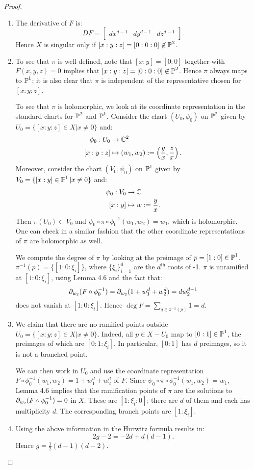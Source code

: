 \documentclass{article}
\begin{document}
\begin{proof}
\begin{enumerate}
\item The derivative of $F$ is:
\[	DF = \left[ \begin{array} {ccc} dx^{d-1} & dy^{d-1} & dz^{d-1} \end{array} \right].	\]
Hence $X$ is singular only if $[x:y:z] = [0:0:0] \not \in \operatorname{\mathbb{P}}^2$.
\item To see that $\pi$ is well-defined, note that $[x:y] = [0:0]$ together with $F(x,y,z) = 0$
implies that $[x:y:z] = [0:0:0] \not \in \operatorname{\mathbb{P}}^2$. Hence $\pi$ always maps to $\operatorname{\mathbb{P}}^1$; it is also
clear that $\pi$ is independent of the representative chosen for $[x:y:z]$.

To see that $\pi$ is holomorphic, we look at its coordinate representation in the standard charts
for $\operatorname{\mathbb{P}}^2$ and $\operatorname{\mathbb{P}}^1$. Consider the chart $(U_0,\phi_0)$ on $\operatorname{\mathbb{P}}^2$ given by $U_0 = \{[x:y:z] \in X 
| x\neq 0\}$ and:
\begin{align*}
\phi_0 : U_0 &\to \mathbb{C}^2 \\
[x:y:z] &\mapsto (w_1, w_2) := \left(\frac{y}{x}, \frac{z}{x}\right).
\end{align*}
Moreover, consider the chart $(V_0, \psi_0)$ on $\operatorname{\mathbb{P}}^1$ given by $V_0 = \{[x:y] \in \operatorname{\mathbb{P}}^1 | x \neq 0\}$
and:
\begin{align*}
\psi_0 : V_0 &\to \mathbb{C} \\
[x:y] &\mapsto w := \frac{y}{x}.
\end{align*}
Then $\pi(U_0) \subset V_0$ and $\psi_0 \circ \pi \circ \phi_0^{-1}(w_1, w_2) = w_1$, which is holomorphic.
One can check in a similar fashion that the other coordinate representations of $\pi$ are holomorphic as
well.

We compute the degree of $\pi$ by looking at the preimage of $p = [1:0] \in \operatorname{\mathbb{P}}^1$. $\pi^{-1}(p) =
\{ [1:0:\xi_i] \}$, where $\{\xi_i\}_{i=1}^d$ are the $d^{\text{th}}$ roots of -1. $\pi$ is unramified
at $[1:0:\xi_i]$, using Lemma 4.6 and the fact that:
\[	\partial_{w_2}(F\circ \phi_0^{-1}) = \partial_{w_2}(1 + w_1^d + w_2^d) = dw_2^{d-1}	\]
does not vanish at $[1:0:\xi_i]$. Hence $\deg F = \sum_{q \in \pi^{-1}(p)} 1 = d$.
\item We claim that there are no ramified points outside $U_0 = \{[x:y:z] \in X | x\neq 0\}$. Indeed,
all $p \in X - U_0$ map to $[0:1] \in \operatorname{\mathbb{P}}^1$, the preimages of which are $[0:1:\xi_i]$. In particular,
$[0:1]$ has $d$ preimages, so it is not a branched point.

We can then work in $U_0$ and use the coordinate representation $F\circ \phi_0^{-1}(w_1,w_2) = 
1+ w_1^d + w_2^d$ of $F$. Since $\psi_0 \circ \pi \circ \phi_0^{-1}(w_1, w_2) = w_1$, Lemma 4.6 implies
that the ramification points of $\pi$ are the solutions to $\partial_{w_2} (F\circ \phi_0^{-1}) = 0$ in $X$.
These are $[1:\xi_i:0]$; there are $d$ of them and each has multiplicity $d$. The corresponding
branch points are $[1:\xi_i]$.
\item Using the above information in the Hurwitz formula results in:
\[	2g-2 = -2d + d(d-1).	\]
Hence $g = \frac{1}{2}(d-1)(d-2)$.
\end{enumerate}
\end{proof}
\end{document}
